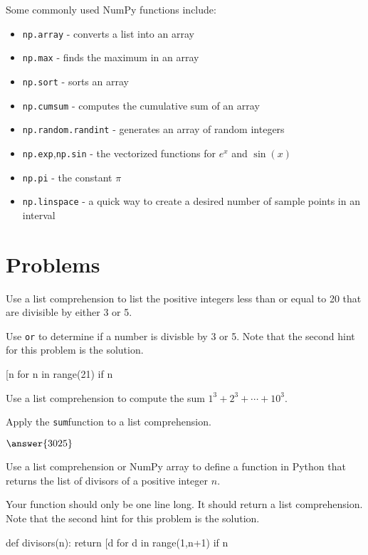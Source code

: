 \documentclass{ximera}
\begin{document}
Some commonly used NumPy functions include:

\begin{itemize}
	\item \verb|np.array| - converts a list into an array
	\item \verb|np.max| - finds the maximum in an array
	\item \verb|np.sort| - sorts an array
	\item \verb|np.cumsum| - computes the cumulative sum of an array
	\item \verb|np.random.randint| - generates an array of random integers
	\item \verb|np.exp|,\verb|np.sin| - the vectorized functions for $e^x$ and $\sin(x)$
	\item \verb|np.pi| - the constant $\pi$
	\item \verb|np.linspace| - a quick way to create a desired number of sample points in an interval
\end{itemize}

\section{Problems}

\begin{question}
Use a list comprehension to list the positive integers less than or equal to 20 that are divisible by either 3 or 5.
	\begin{hint}
	Use \verb|or| to determine if a number is divisble by 3 or 5. Note that the second hint for this problem is the solution.
	\end{hint}
	\begin{hint}
\begin{sageCell}
	[n for n in range(21) if n%
\end{sageCell}
	\end{hint}
\end{question}

\begin{question}
Use a list comprehension to compute the sum $1^3+2^3+\cdots+10^3.$
	\begin{hint}
	Apply the \verb|sum|function to a list comprehension.
	\end{hint}
        $\answer{3025}$
\end{question}

\begin{question}
Use a list comprehension or NumPy array to define a function in Python that returns the list of divisors of a positive integer $n$.
	\begin{hint}
	Your function should only be one line long. It should return a list comprehension. Note that the second hint for this problem is the solution.
	\end{hint}
	\begin{hint}
\begin{sageCell}
def divisors(n):
        return [d for d in range(1,n+1) if n%
\end{sageCell}
	\end{hint}
\end{question}
\end{document}
